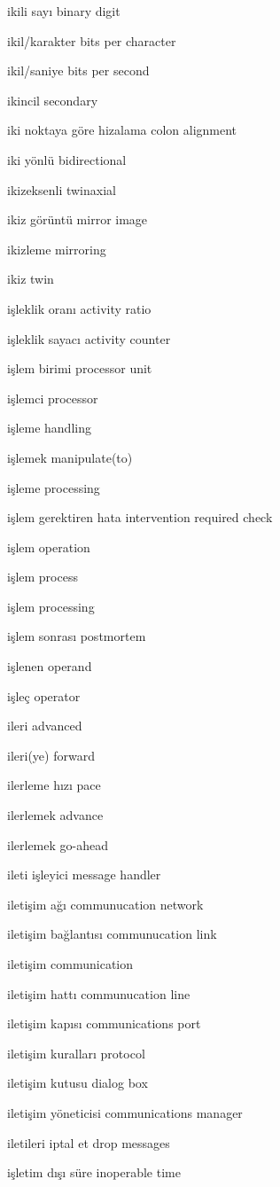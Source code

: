 \documentclass[12pt,fleqn]{article}\usepackage{../../common}
\begin{document}
ikili sayı binary digit

ikil/karakter bits per character

ikil/saniye bits per second

ikincil secondary

iki noktaya göre hizalama colon alignment

iki yönlü bidirectional

ikizeksenli twinaxial

ikiz görüntü mirror image

ikizleme mirroring

ikiz twin

işleklik oranı activity ratio

işleklik sayacı activity counter

işlem birimi processor unit

işlemci processor

işleme handling

işlemek manipulate(to)

işleme processing

işlem gerektiren hata intervention required check

işlem operation

işlem process

işlem processing

işlem sonrası postmortem

işlenen operand

işleç operator

ileri advanced

ileri(ye) forward

ilerleme hızı pace

ilerlemek advance

ilerlemek go-ahead

ileti işleyici message handler

iletişim ağı communucation network

iletişim bağlantısı communucation link

iletişim communication

iletişim hattı communucation line

iletişim kapısı communications port

iletişim kuralları protocol

iletişim kutusu dialog box

iletişim yöneticisi communications manager

iletileri iptal et drop messages

işletim dışı süre inoperable time
\end{document}
